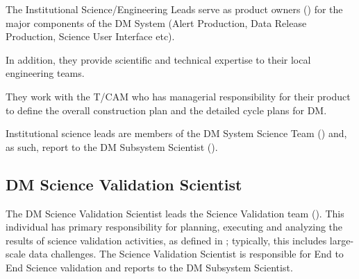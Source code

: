 The Institutional Science/Engineering Leads serve as product owners () for the major components of the DM System (Alert Production, Data Release Production, Science User Interface etc).

In addition, they provide scientific and technical expertise to their local engineering teams.

They work with the T/CAM who has managerial responsibility for their product to define the overall construction plan and the detailed cycle plans for DM.

Institutional science leads are members of the DM System Science Team () and, as such, report to the DM Subsystem Scientist ().

\subsection{DM Science Validation Scientist}
\label{role:dmsvs}

The DM Science Validation Scientist leads the Science Validation team ().
This individual has primary responsibility for planning, executing and analyzing the results of science validation activities, as defined in ; typically, this includes large-scale data challenges.
The Science Validation Scientist is responsible for End to End Science validation and reports to the DM Subsystem Scientist.
